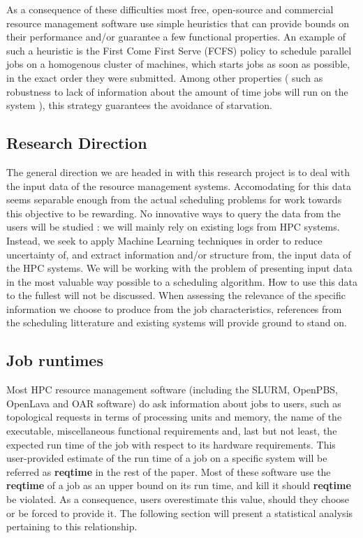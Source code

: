 \documentclass{article}
\begin{document}
As a consequence of these difficulties most free, open-source and commercial resource management software use simple heuristics that can provide bounds on their performance and/or guarantee a few functional properties.
An example of such a heuristic is the First Come First Serve (FCFS) policy to schedule parallel jobs on a homogenous cluster of machines, which starts jobs as soon as possible, in the exact order they were submitted.
Among other properties ( such as robustness to lack of information about the amount of time jobs will run on the system ), this strategy guarantees the avoidance of starvation.

\subsection{Research Direction}
The general direction we are headed in with this research project is to deal with the input data of the resource management systems.
Accomodating for this data seems separable enough from the actual scheduling problems for work towards this objective to be rewarding.
No innovative ways to query the data from the users will be studied : we will mainly rely on existing logs from HPC systems. Instead, we seek to apply Machine Learning techniques in order to reduce uncertainty of, and extract information and/or structure from, the input data of the HPC systems.
We will be working with the problem of presenting input data in the most valuable way possible to a scheduling algorithm. How to use this data to the fullest will not be discussed.
When assessing the relevance of the specific information we choose to produce from the job characteristics, references from the scheduling litterature and existing systems will provide ground to stand on.

\subsection{Job runtimes}
Most HPC resource management software (including the SLURM, OpenPBS, OpenLava and OAR software) do ask information about jobs to users, such as topological requests in terms of processing units and memory, the name of the executable, miscellaneous functional requirements and, last but not least, the expected run time of the job with respect to its hardware requirements.
This user-provided estimate of the run time of a job on a specific system will be referred as \textbf{reqtime} in the rest of the paper. Most of these software use the \textbf{reqtime} of a job as an upper bound on its run time, and kill it should \textbf{reqtime} be violated. As a consequence, users overestimate this value, should they choose or be forced to provide it. The following section will present a statistical analysis pertaining to this relationship.
\end{document}
